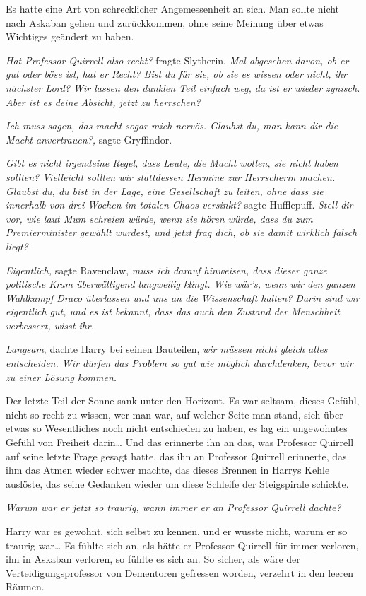 {Es hatte eine Art von schrecklicher Angemessenheit an sich. Man sollte nicht nach Askaban gehen und zurückkommen, ohne seine Meinung über etwas Wichtiges geändert zu haben.

\emph{Hat Professor Quirrell also recht?} fragte Slytherin. \emph{Mal abgesehen davon, ob er gut oder böse ist, hat er Recht? Bist du für sie, ob sie es wissen oder nicht, ihr nächster Lord? Wir lassen den dunklen Teil einfach weg, da ist er wieder zynisch. Aber ist es deine Absicht, jetzt zu herrschen?}

\emph{Ich muss sagen, das macht sogar mich nervös. Glaubst du, man kann dir die Macht anvertrauen?,} sagte Gryffindor.

\emph{Gibt es nicht irgendeine Regel, dass Leute, die Macht wollen, sie nicht haben sollten? Vielleicht sollten wir stattdessen Hermine zur Herrscherin machen. Glaubst du, du bist in der Lage, eine Gesellschaft zu leiten, ohne dass sie innerhalb von drei Wochen im totalen Chaos versinkt?} sagte Hufflepuff. \emph{Stell dir vor, wie laut Mum schreien würde, wenn sie hören würde, dass du zum Premierminister gewählt wurdest, und jetzt frag dich, ob sie damit wirklich falsch liegt?}

\emph{Eigentlich,} sagte Ravenclaw, \emph{muss ich darauf hinweisen, dass dieser ganze politische Kram überwältigend langweilig klingt. Wie wär's, wenn wir den ganzen Wahlkampf Draco überlassen und uns an die Wissenschaft halten? Darin sind wir eigentlich gut, und es ist bekannt, dass das auch den Zustand der Menschheit verbessert, wisst ihr.}

\emph{Langsam}, dachte Harry bei seinen Bauteilen, \emph{wir müssen nicht gleich alles entscheiden. Wir dürfen das Problem so gut wie möglich durchdenken, bevor wir zu einer Lösung kommen.}

Der letzte Teil der Sonne sank unter den Horizont. Es war seltsam, dieses Gefühl, nicht so recht zu wissen, wer man war, auf welcher Seite man stand, sich über etwas so Wesentliches noch nicht entschieden zu haben, es lag ein ungewohntes Gefühl von Freiheit darin… Und das erinnerte ihn an das, was Professor Quirrell auf seine letzte Frage gesagt hatte, das ihn an Professor Quirrell erinnerte, das ihm das Atmen wieder schwer machte, das dieses Brennen in Harrys Kehle auslöste, das seine Gedanken wieder um diese Schleife der Steigspirale schickte.

\emph{Warum war er jetzt so traurig, wann immer er an Professor Quirrell dachte?}

Harry war es gewohnt, sich selbst zu kennen, und er wusste nicht, warum er so traurig war… Es fühlte sich an, als hätte er Professor Quirrell für immer verloren, ihn in Askaban verloren, so fühlte es sich an. So sicher, als wäre der Verteidigungsprofessor von Dementoren gefressen worden, verzehrt in den leeren Räumen.

}
